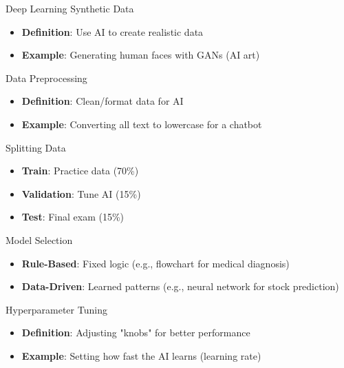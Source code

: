 \documentclass{beamer}
\begin{document}
\begin{frame}{Deep Learning Synthetic Data}
\begin{itemize}
\item \textbf{Definition}: Use AI to create realistic data
\item \textbf{Example}: Generating human faces with GANs (AI art)
\end{itemize}
\end{frame}

\begin{frame}{Data Preprocessing}
\begin{itemize}
\item \textbf{Definition}: Clean/format data for AI
\item \textbf{Example}: Converting all text to lowercase for a chatbot
\end{itemize}
\end{frame}

\begin{frame}{Splitting Data}
\begin{itemize}
\item \textbf{Train}: Practice data (70\%)
\item \textbf{Validation}: Tune AI (15\%)
\item \textbf{Test}: Final exam (15\%)
\end{itemize}
\end{frame}

\begin{frame}{Model Selection}
\begin{itemize}
\item \textbf{Rule-Based}: Fixed logic (e.g., flowchart for medical diagnosis)
\item \textbf{Data-Driven}: Learned patterns (e.g., neural network for stock prediction)
\end{itemize}
\end{frame}

\begin{frame}{Hyperparameter Tuning}
\begin{itemize}
\item \textbf{Definition}: Adjusting "knobs" for better performance
\item \textbf{Example}: Setting how fast the AI learns (learning rate)
\end{itemize}
\end{frame}
\end{document}
